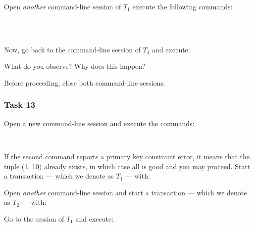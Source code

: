 \vgap

\noindent Open {\em another} command-line session of $T_1$ execute the following commands:

\vgap

\noindent {}  \\
\noindent {}  \\
\noindent {}

\vgap

\noindent Now, go back to the command-line session of $T_1$ and execute:

\vgap

\noindent {}

\vgap

\noindent What do you observe? Why does this happen?

\vgap

\noindent Before proceeding, close both command-line sessions.


\subsubsection{Task 13}

Open a new command-line session and execute the commands:

\vgap

\noindent {} \\
\noindent {}

\vgap

\noindent If the second command reports a primary key constraint error, it means that the tuple (1, 10) already exists, in which case all is good and you may proceed. Start a transaction --- which we denote as $T_1$ --- with:

\vgap

\noindent {}

\vgap

\noindent Open {\em another} command-line session and start a transaction --- which we denote as $T_2$ --- with:

\vgap

\noindent {}

\vgap

\noindent Go to the session of $T_1$ and execute:

